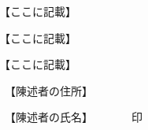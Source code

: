 \documentclass{ltjsarticle}
\begin{document}
\maketitle











\SecB{}

【ここに記載】

\SecB{}

【ここに記載】

\SecB{}

【ここに記載】




\vspace{3\zw}


\noindent{}　【陳述者の住所】

\noindent{}　【陳述者の氏名】　　　　印

\Ijo[2\zw]
\end{document}
